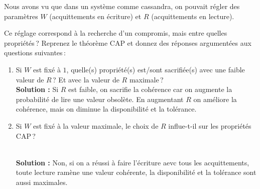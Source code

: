 \documentclass[11pt,a4paper]{article}
\newenvironment{solution}[0]{
~\\ \color{red} \textbf{Solution : }\color{black}}{%
}
\begin{document}
Nous avons vu que dans un système comme cassandra, on pouvait régler des paramètres
$W$ (acquittements en écriture) et $R$ (acquittements en lecture). 

Ce réglage correspond à la recherche d'un compromis, mais entre quelles propriétés\,?  
Reprenez le théorème CAP et donnez des réponses argumentées aux questions suivantes\,:

\begin{enumerate}
  \item Si $W$ est fixé à $1$, quelle(s) propriété(s) est/sont sacrifiée(s) avec une faible valeur de $R$\,? 
    Et avec la valeur de $R$ maximale\,?
\begin{solution}
Si $R$ est faible, on sacrifie la cohérence car on augmente la probabilité de lire une valeur obsolète.
En augmentant $R$ on améliore la cohérence, mais on diminue la disponibilité et la tolérance.
\end{solution}

  \item Si $W$ est fixé à la valeur maximale, le choix de $R$ influe-t-il sur les propriétés CAP\,? 

\begin{solution}
Non, si on a réussi à faire l'écriture aevc tous les acquittements, toute lecture ramène une valeur cohérente,
la disponibilité et la tolérance sont aussi maximales.
\end{solution}
\end{enumerate}
\end{document}
